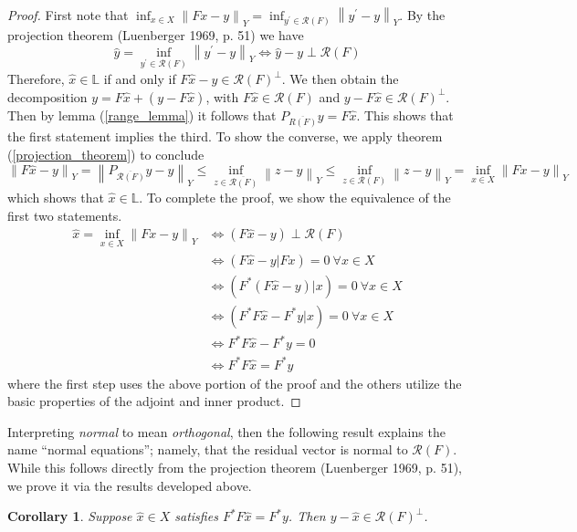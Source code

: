 \documentclass[12pt]{article}
\newcommand*{\norm}[1]{\left\lVert#1\right\rVert}
\newcommand{\R}{\mathcal{R}}
\newtheorem{corollary}{Corollary}
\begin{document}
\begin{proof} 
First note that $\inf_{x \in X} \norm{Fx - y}_Y = \inf_{y^\prime \in \R(F)} \norm{y^\prime - y}_Y$. By the projection theorem (Luenberger 1969, p. 51) 
we have \[\hat{y} = \inf_{y^\prime \in \R(F)} \norm{y^\prime - y}_Y \iff \hat{y} - y \perp \R(F)\] 
Therefore, $\hat{x} \in \mathbb{L}$ if and only if $F\hat{x} - y \in \R(F)^\perp$. We then obtain the decomposition
$y = F\hat{x} + (y - F\hat{x})$, with $F\hat{x} \in \R(F)$ and $y - F\hat{x} \in \R(F)^\perp$. Then by lemma (\ref{range_lemma}) it follows that
$P_{\overline{R(F)}} y = F\hat{x}$. This shows that the first statement implies the third. To show the converse, we apply theorem (\ref{projection_theorem})
to conclude \[\norm{F\hat{x} - y}_Y = \norm{P_{\overline{\R(F)}}y - y}_Y \leq \inf_{z \in \overline{\R(F)}} \norm{z - y}_Y \leq \inf_{z \in \R(F)} \norm{z - y}_Y = \inf_{x \in X} \norm{Fx - y}_Y\]
which shows that $\hat{x} \in \mathbb{L}$. To complete the proof, we show the equivalence of the first two statements. 
\begin{align*} 
\hat{x} = \inf_{x \in X} \norm{Fx - y}_Y &\iff (F\hat{x} - y) \perp \R(F) \\
                                                            &\iff (F\hat{x} - y| Fx) = 0 \ \forall x \in X \\
                                                            &\iff (F^*(F\hat{x} - y)| x) = 0 \ \forall x \in X \\
                                                            &\iff (F^*F\hat{x} - F^*y| x) = 0 \ \forall x \in X \\
                                                            &\iff F^*F\hat{x} - F^*y = 0 \\
                                                            &\iff F^*F\hat{x} = F^*y                                                            
\end{align*} 
where the first step uses the above portion of the proof and the others utilize the basic properties of the adjoint and inner product.
\end{proof} 

Interpreting \textit{normal} to mean \textit{orthogonal}, then the following result explains the name ``normal equations''; namely, that 
the residual vector is normal to $\R(F)$. While this follows directly from the projection theorem (Luenberger 1969, p. 51), we prove it
via the results developed above. 

\begin{corollary} \label{normal_residual}
Suppose $\hat{x} \in X$ satisfies $F^* F\hat{x} = F^* y$. Then $y - \hat{x} \in \R(F)^\perp$.
\end{corollary}
\end{document}
